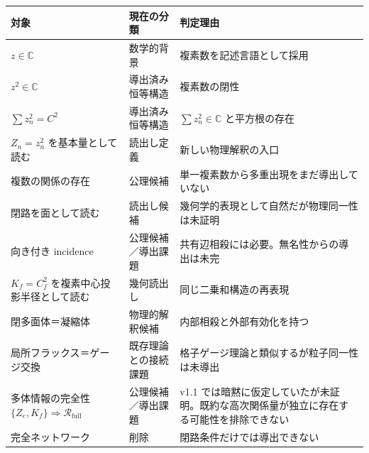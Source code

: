 \documentclass[
  a4paper,
]{ltjsarticle}
\newcounter{none} %
\begin{document}
{\def\LTcaptype{none} %
\begin{longtable}[]{@{}
  >{\raggedright\arraybackslash}p{}
  >{\raggedright\arraybackslash}p{}
  >{\raggedright\arraybackslash}p{}@{}}
\toprule\noalign{}
\begin{minipage}[b]{\linewidth}\raggedright
対象
\end{minipage} & \begin{minipage}[b]{\linewidth}\raggedright
現在の分類
\end{minipage} & \begin{minipage}[b]{\linewidth}\raggedright
判定理由
\end{minipage} \\
\midrule\noalign{}
\endhead
\bottomrule\noalign{}
\endlastfoot
\(z\in\mathbb C\) & 数学的背景 & 複素数を記述言語として採用 \\
\(z^2\in\mathbb C\) & 導出済み恒等構造 & 複素数の閉性 \\
\(\sum z_n^2=C^2\) & 導出済み恒等構造 & \(\sum z_n^2\in\mathbb C\)
と平方根の存在 \\
\(Z_n=z_n^2\) を基本量として読む & 読出し定義 & 新しい物理解釈の入口 \\
複数の関係の存在 & 公理候補 &
単一複素数から多重出現をまだ導出していない \\
閉路を面として読む & 読出し候補 &
幾何学的表現として自然だが物理同一性は未証明 \\
向き付き incidence & 公理候補／導出課題 &
共有辺相殺には必要。無名性からの導出は未完 \\
\(K_f=C_f^2\) を複素中心投影半径として読む & 幾何読出し &
同じ二乗和構造の再表現 \\
閉多面体＝凝縮体 & 物理的解釈候補 & 内部相殺と外部有効化を持つ \\
局所フラックス＝ゲージ交換 & 既存理論との接続課題 &
格子ゲージ理論と類似するが粒子同一性は未導出 \\
多体情報の完全性 \(\{Z_e,K_f\}\Rightarrow\mathcal R_{\mathrm{full}}\) &
公理候補／導出課題 & v1.1
では暗黙に仮定していたが未証明。既約な高次関係量が独立に存在する可能性を排除できない \\
完全ネットワーク & 削除 & 閉路条件だけでは導出できない \\
\end{longtable}
}
\end{document}

